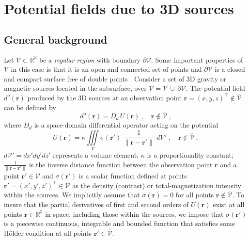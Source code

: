 \section{Potential fields due to 3D sources}
\label{sec:potential_fields_3D_sources}


\subsection{General background}
\label{subsec:background}


Let $\mathcal{V} \subset \mathbb{R}^{3}$ be a \textit{regular region} with boundary
$\partial \mathcal{V}$. 
Some important properties of $\mathcal{V}$ in this case is that it is an open and 
connected set of points and $\partial \mathcal{V}$ is a closed and compact surface 
free of double points \citep[][ p. 22]{freeden_gerhards2012}. 
Consider a set of 3D gravity or magnetic sources located in the subsurface,
over $\overline{\mathcal{V}} = \mathcal{V} \, \cup \, \partial \mathcal{V}$.
The potential field $d^{o}(\mathbf{r})$ produced by the 3D sources at an observation point 
$\mathbf{r} = (x, y, z)^{\top} \notin \overline{\mathcal{V}}$ 
can be defined by
\begin{equation}
	d^{o}(\mathbf{r}) = D_{d} \, U(\mathbf{r}) \: , 
	\quad \mathbf{r} \notin \overline{\mathcal{V}} \: ,
	\label{eq:observed-data-space}
\end{equation}
where $D_{d}$ is a space-domain differential operator
acting on the potential
\begin{equation}
	U(\mathbf{r}) = \kappa \iiint\limits_{\mathcal{V}}
	\sigma(\mathbf{r}') \: \frac{1}{\| \mathbf{r} - \mathbf{r}'\|}
	\: d\mathcal{V}' \: , 
	\quad \mathbf{r} \notin \overline{\mathcal{V}} \: ,
	\label{eq:potential-U-space}
\end{equation}
$d\mathcal{V}' = dx'dy'dz'$ represents a volume element;
$\kappa$ is a proportionality constant;
$\tfrac{1}{\| \mathbf{r} - \mathbf{r}' \|}$ is the inverse distance function
between the observation point $\mathbf{r}$ and a point $\mathbf{r}' \in \mathcal{V}$
and $\sigma(\mathbf{r}')$ is a scalar function defined at points 
$\mathbf{r}' = (x', y', z')^{\top} \in \overline{\mathcal{V}}$ 
as the density (contrast) or total-magnetization intensity within the sources.
We implicitly assume that $\sigma(\mathbf{r}) = 0$ for all points 
$\mathbf{r} \notin \overline{\mathcal{V}}$.
To insure that the partial derivatives of first and second orders of $U(\mathbf{r})$ 
exist at all points $\mathbf{r} \in \mathbb{R}^{3}$ in space, including those within the sources,
we impose that $\sigma(\mathbf{r}')$ is a piecewise continuous, integrable and bounded function
that satisfies some Hölder condition \citep[][ p. 152]{kellogg1967} at all points
$\mathbf{r}' \in \overline{\mathcal{V}}$.

